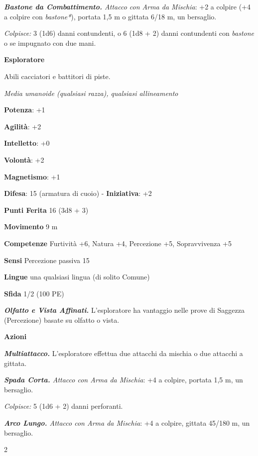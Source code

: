 \begin{multicols}{2}
\emph{\textbf{Bastone da Combattimento.} Attacco con Arma da Mischia}:
+2 a colpire (+4 a colpire con \emph{bastone*}), portata 1,5 m o gittata
6/18 m, un bersaglio.

\emph{Colpisce:} 3 (1d6) danni contundenti, o 6 (1d8 + 2) danni
contundenti con \emph{bastone} o se impugnato con due mani.

\textbf{Esploratore}

Abili cacciatori e battitori di piste.

\emph{Media umanoide (qualsiasi razza), qualsiasi allineamento}

\textbf{Potenza}: +1

\textbf{Agilità}: +2

\textbf{Intelletto}: +0

\textbf{Volontà}: +2

\textbf{Magnetismo}: +1

\textbf{Difesa}: 15 (armatura di cuoio) - \textbf{Iniziativa}: +2

\textbf{Punti Ferita} 16 (3d8 + 3)

\textbf{Movimento} 9 m

\textbf{Competenze} Furtività +6, Natura +4, Percezione +5, Sopravvivenza +5

\textbf{Sensi} Percezione passiva 15

\textbf{Lingue} una qualsiasi lingua (di solito Comune)

\textbf{Sfida} 1/2 (100 PE)

\emph{\textbf{Olfatto e Vista Affinati.}} L'esploratore ha vantaggio
nelle prove di Saggezza (Percezione) basate su olfatto o vista.

\textbf{Azioni}

\emph{\textbf{Multiattacco.}} L'esploratore effettua due attacchi da
mischia o due attacchi a gittata.

\emph{\textbf{Spada Corta.} Attacco con Arma da Mischia}: +4 a colpire,
portata 1,5 m, un bersaglio.

\emph{Colpisce:} 5 (1d6 + 2) danni perforanti.

\emph{\textbf{Arco Lungo.} Attacco con Arma da Mischia}: +4 a colpire,
gittata 45/180 m, un bersaglio.

\end{multicols}{2}
